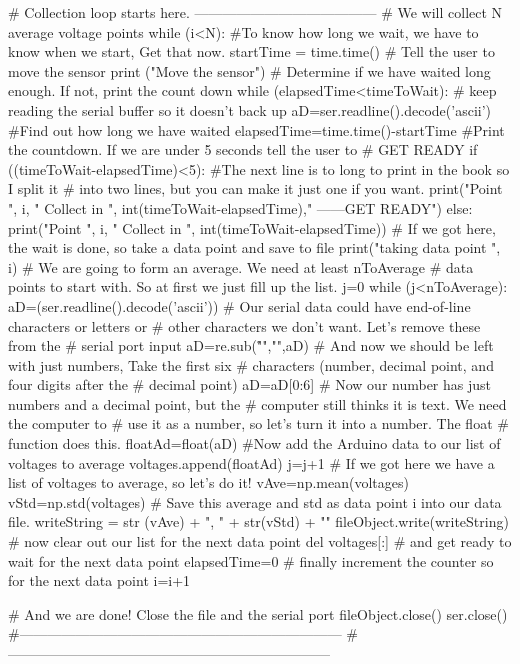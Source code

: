 \begin{python}
 
# Collection loop starts here. ---------------------------------------
# We will collect  N  average voltage points
while (i<N):
    #To know how long we wait, we have to know when we start, Get that now.
    startTime = time.time()
    # Tell the user to move the sensor
    print ("Move the sensor")
    # Determine if we have waited long enough. If not, print the count down
    while (elapsedTime<timeToWait):
        # keep reading the serial buffer so it doesn't back up
        aD=ser.readline().decode('ascii')
        #Find out how long we have waited
        elapsedTime=time.time()-startTime
        #Print the countdown. If we are under 5 seconds tell the user to 
        #  GET READY
        if ((timeToWait-elapsedTime)<5):
            #The next line is to long to print in the book so I split it
            #  into two lines, but you can make it just one if you want.
            print("Point ", i, " Collect in ", 
            int(timeToWait-elapsedTime)," ------GET READY")
        else:
            print("Point ", i, " Collect in ", int(timeToWait-elapsedTime))
    # If we got here, the wait is done, so take a data point and save to file
    print("taking data point ", i)
    # We are going to form an average. We need at least nToAverage
    #    data points to start with. So at first we just fill up the list. 
    j=0
    while (j<nToAverage):
        aD=(ser.readline().decode('ascii'))
        # Our serial data could have end-of-line characters or letters or 
        #   other characters we don't want. Let's remove these from the 
        #   serial port input
        aD=re.sub("\n\r\s","",aD)
        # And now we should be left with just numbers, Take the first six 
        #   characters (number, decimal point, and four digits after the
        #   decimal point)
        aD=aD[0:6]
        # Now our number has just numbers and a decimal point, but the 
        #   computer still thinks it is text. We need the computer to 
        #   use it as a number, so let's turn it into a number. The float
        #   function does this. 
        floatAd=float(aD)
        #Now add the Arduino data to our list of voltages to average 
        voltages.append(floatAd) 
        j=j+1
    # If we got here we have a list of voltages to average, so let's do it!    
    vAve=np.mean(voltages)
    vStd=np.std(voltages)
    # Save this average and std as data point i into our data file.
    writeString = str (vAve) + ", " + str(vStd) + "\n"
    fileObject.write(writeString)
    # now clear out our list for the next data point
    del voltages[:]
    # and get ready to wait for the next data point
    elapsedTime=0
    # finally increment the counter so for the next data point
    i=i+1
 
# And we are done!  Close the file and the serial port
fileObject.close()
ser.close()
#---------------------------------------------------------------------
#---------------------------------------------------------------------    
\end{python}

